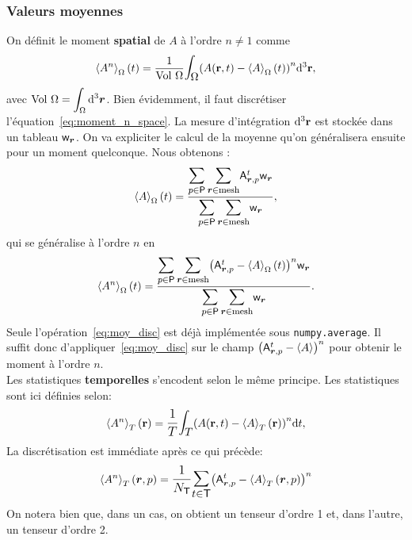 \documentclass[13pt, a4paper]{extarticle}
\begin{document}
\subsubsection{Valeurs moyennes}
\noindent On définit le moment {\bf spatial} de $A$ à l'ordre $n\neq 1$ comme
\begin{align}
    \mean{A^n}_{\Omega}(t) = \dfrac{1}{\text{Vol}~\Omega}\mathlarger{\mathlarger{\int_\Omega}}
                 \qty(A(\g{r},t)-\mean{A}_{\Omega}(t))^n\dd^3\g{r},
    \label{eq:moment_n_space}
\end{align}
avec $\displaystyle\text{Vol}~\Omega = \int_\Omega \dd^3\boldsymbol{r}$. Bien évidemment,
il faut discrétiser l'équation~\eqref{eq:moment_n_space}.
La mesure d'intégration $\dd^3\mathbf{r}$ est stockée dans un tableau $\mathsf{w}_{\boldsymbol{r}}$.
On va expliciter le calcul de la moyenne qu'on généralisera ensuite
pour un moment quelconque. Nous obtenons :
\begin{align}
    \mean{A}_{\Omega}(t) = \dfrac{\mathlarger{\mathlarger{\sum_{p\in\qop{P}}\sum_{\git{r}\in\text{mesh}}}}
               \qop{A}_{\git{r},p}^t\qop{w}_{\git{r}}}
               {\mathlarger{\mathlarger{\sum_{p\in\qop{P}}\sum_{\git{r}\in\text{mesh}}}}
               \qop{w}_{\git{r}}},
    \label{eq:moy_disc}
\end{align}
qui se généralise à l'ordre $n$ en 
\begin{align}
    \mean{A^n}_{\Omega}(t) = \dfrac{\mathlarger{\mathlarger{\sum_{p\in\qop{P}}\sum_{\git{r}\in\text{mesh}}}}
               \qty(\qop{A}_{\git{r},p}^t-\mean{A}_\Omega(t))^n\qop{w}_{\git{r}}}
               {\mathlarger{\mathlarger{\sum_{p\in\qop{P}}\sum_{\git{r}\in\text{mesh}}}}
               \qop{w}_{\git{r}}}.
\end{align}
Seule l'opération~\eqref{eq:moy_disc} est déjà implémentée sous \texttt{numpy.average}.
Il suffit donc d'appliquer~\eqref{eq:moy_disc} sur le champ $\qty(\mathsf{A}_{\boldsymbol{r},p}^t-\left\langle A\right\rangle)^n$
pour obtenir le moment à l'ordre $n$. \\

\noindent Les statistiques {\bf temporelles} s'encodent selon le même principe.
Les statistiques sont ici définies selon:
\begin{align}
    \mean{A^n}_{T}(\g{r}) = \mathlarger{\dfrac{1}{T}}\mathlarger{\mathlarger{\int_T}}
                 \qty(A(\g{r},t)-\mean{A}_{T}(\g{r}))^n\dd t,
\end{align}
La discrétisation est immédiate après ce qui précède:
\begin{align}
    \mean{A^n}_{T}(\git{r},p) = \mathlarger{\dfrac{1}{N_{\qop{T}}}}\mathlarger{\mathlarger{\sum_{t\in\qop{T}}}}
               \qty(\qop{A}_{\git{r},p}^t-\mean{A}_T(\git{r},p))^n
\end{align}
On notera bien que, dans un cas, on obtient un tenseur d'ordre 1 et, dans l'autre, un tenseur
d'ordre 2. 
\end{document}
